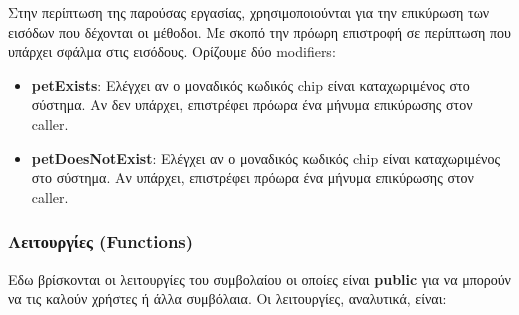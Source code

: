 \documentclass[12pt,a4paper]{article}
\begin{document}
Στην περίπτωση της παρούσας εργασίας, χρησιμοποιούνται για την επικύρωση των εισόδων που δέχονται οι μέθοδοι. Με σκοπό την πρόωρη επιστροφή σε περίπτωση που υπάρχει σφάλμα στις εισόδους. Ορίζουμε δύο modifiers:
\begin{itemize}
    \item \textbf{petExists}: Ελέγχει αν ο μοναδικός κωδικός chip είναι καταχωριμένος στο σύστημα. Αν δεν υπάρχει, επιστρέφει πρόωρα ένα μήνυμα επικύρωσης στον caller.
    \item \textbf{petDoesNotExist}: Ελέγχει αν ο μοναδικός κωδικός chip είναι καταχωριμένος στο σύστημα. Αν υπάρχει, επιστρέφει πρόωρα ένα μήνυμα επικύρωσης στον caller.
\end{itemize}

\subsubsection{Λειτουργίες (Functions)}
Εδω βρίσκονται οι λειτουργίες του συμβολαίου οι οποίες είναι \textbf{public} για να μπορούν να τις καλούν χρήστες ή άλλα συμβόλαια. Οι λειτουργίες, αναλυτικά, είναι:
\end{document}
